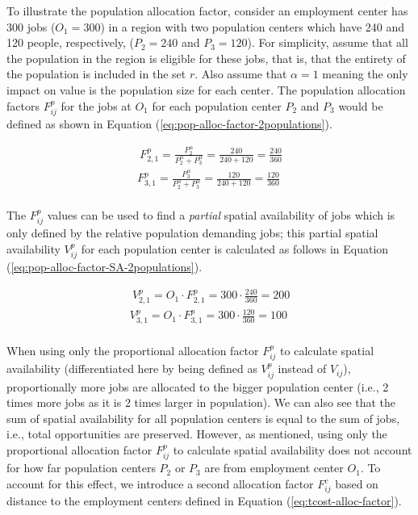 \documentclass[]{elsarticle} %
\begin{document}
To illustrate the population allocation factor, consider an employment
center has 300 jobs (\(O_1= 300\)) in a region with two population
centers which have 240 and 120 people, respectively, (\(P_2= 240\) and
\(P_3 = 120\)). For simplicity, assume that all the population in the
region is eligible for these jobs, that is, that the entirety of the
population is included in the set \(r\). Also assume that \(\alpha=1\)
meaning the only impact on value is the population size for each center.
The population allocation factors \(F^p_{ij}\) for the jobs at \(O_1\)
for each population center \(P_2\) and \(P_3\) would be defined as shown
in Equation (\ref{eq:pop-alloc-factor-2populations}).

\begin{equation}
\label{eq:pop-alloc-factor-2populations}
\begin{array}{l}\
F^p_{2,1} = \frac{P_2 ^\alpha}{P_2^\alpha + P_3^\alpha} = \frac{240}{240 + 120} = \frac{240}{360}\\
F^p_{3,1} = \frac{P_3^\alpha}{P_2^\alpha + P_3^\alpha}  = \frac{120}{240 + 120} = \frac{120}{360}\\
\end{array}
\end{equation}

The \(F^p_{ij}\) values can be used to find a \emph{partial} spatial
availability of jobs which is only defined by the relative population
demanding jobs; this partial spatial availability \(V^p_{ij}\) for each
population center is calculated as follows in Equation
(\ref{eq:pop-alloc-factor-SA-2populations}).

\begin{equation}
\label{eq:pop-alloc-factor-SA-2populations}
\begin{array}{l}\
V^p_{2,1} = O_1 \cdot F^p_{2,1} = 300 \cdot \frac{240}{360} = 200 \\
V^p_{3,1} = O_1 \cdot F^p_{3,1} = 300 \cdot \frac{120}{360} = 100 \\
\end{array}
\end{equation}

When using only the proportional allocation factor \(F^p_{ij}\) to
calculate spatial availability (differentiated here by being defined as
\(V^p_{ij}\) instead of \(V_{ij}\)), proportionally more jobs are
allocated to the bigger population center (i.e., 2 times more jobs as it
is 2 times larger in population). We can also see that the sum of
spatial availability for all population centers is equal to the sum of
jobs, i.e., total opportunities are preserved. However, as mentioned,
using only the proportional allocation factor \(F^p_{ij}\) to calculate
spatial availability does not account for how far population centers
\(P_2\) or \(P_3\) are from employment center \(O_1\). To account for
this effect, we introduce a second allocation factor \(F^c_{ij}\) based
on distance to the employment centers defined in Equation
(\ref{eq:tcost-alloc-factor}).
\end{document}
